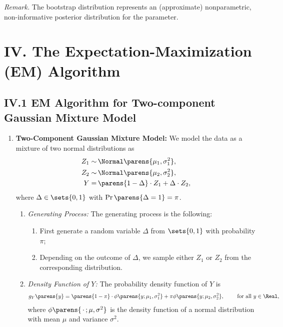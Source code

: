 \documentclass[12pt]{article}
\begin{document}
\begin{enumerate}[label=\textbf{\arabic*.}]
	\textit{Remark.} The bootstrap distribution represents an (approximate) nonparametric, non-informative posterior distribution for the parameter. 

\end{enumerate}


\section*{IV. The Expectation-Maximization (EM) Algorithm}

\subsection*{IV.1 EM Algorithm for Two-component Gaussian Mixture Model}

\begin{enumerate}[label=\textbf{\arabic*.}]

	\item \textbf{Two-Component Gaussian Mixture Model:} We model the data as a mixture of two normal distributions as 
	\begin{equation}
		\begin{aligned}
			Z_1 \sim & \, \Normal \parens{\mu_1, \sigma_1^2},  \\ 
			Z_2 \sim & \, \Normal \parens{\mu_2, \sigma_2^2},  \\ 
			Y = & \, \parens{1 - \Delta} \cdot Z_1 + \Delta \cdot Z_2, 
		\end{aligned}
	\end{equation}
	where $\Delta \in \sets{ 0, 1 }$ with $\Pr \parens{\Delta = 1} = \pi$. 
	
	\begin{enumerate}
		\item \textit{Generating Process:} The generating process is the following: 
		\begin{enumerate}
			\item First generate a random variable $\Delta$ from $\sets{0, 1}$ with probability $\pi$; 
			\item Depending on the outcome of $\Delta$, we sample either $Z_1$ or $Z_2$ from the corresponding distribution. 
		\end{enumerate}
		
		\item \textit{Density Function of $Y$:} The probability density function of $Y$ is 
		\begin{align}
			g_Y \parens{y} = \parens{1 - \pi} \cdot \phi \parens{y; \mu_1, \sigma_1^2} + \pi \phi \parens{y; \mu_2, \sigma_2^2}, \qquad \text{ for all } y \in \Real, 
		\end{align}
		where $\phi \parens{\,\cdot\,; \mu, \sigma^2}$ is the density function of a normal distribution with mean $\mu$ and variance $\sigma^2$. 
	\end{enumerate}
	 

\end{enumerate}
\end{document}
